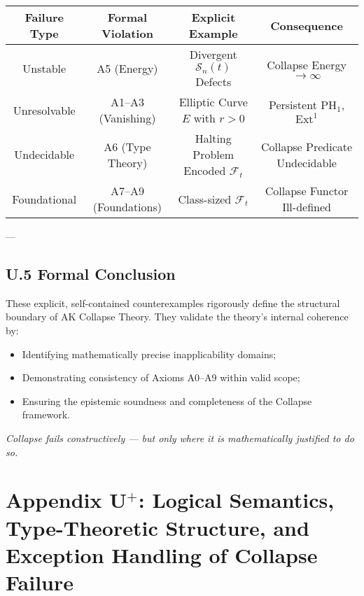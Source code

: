 \documentclass[11pt]{article}
\begin{document}
\begin{center}
\begin{tabular}{|c|c|c|c|}
\hline
\textbf{Failure Type} & \textbf{Formal Violation} & \textbf{Explicit Example} & \textbf{Consequence} \\
\hline
Unstable & A5 (Energy) & Divergent $\mathcal{S}_n(t)$ Defects & Collapse Energy $\to \infty$ \\
Unresolvable & A1–A3 (Vanishing) & Elliptic Curve $E$ with $r>0$ & Persistent $\mathrm{PH}_1$, $\mathrm{Ext}^1$ \\
Undecidable & A6 (Type Theory) & Halting Problem Encoded $\mathcal{F}_t$ & Collapse Predicate Undecidable \\
Foundational & A7–A9 (Foundations) & Class-sized $\mathcal{F}_t$ & Collapse Functor Ill-defined \\
\hline
\end{tabular}
\end{center}

---

\subsection*{U.5 Formal Conclusion}

These explicit, self-contained counterexamples rigorously define the structural boundary of AK Collapse Theory.  
They validate the theory's internal coherence by:

\begin{itemize}
    \item Identifying mathematically precise inapplicability domains;
    \item Demonstrating consistency of Axioms A0–A9 within valid scope;
    \item Ensuring the epistemic soundness and completeness of the Collapse framework.
\end{itemize}

\begin{center}
\textit{Collapse fails constructively — but only where it is mathematically justified to do so.}
\end{center}




\section*{Appendix U$^{+}$: Logical Semantics, Type-Theoretic Structure, and Exception Handling of Collapse Failure}
\end{document}
